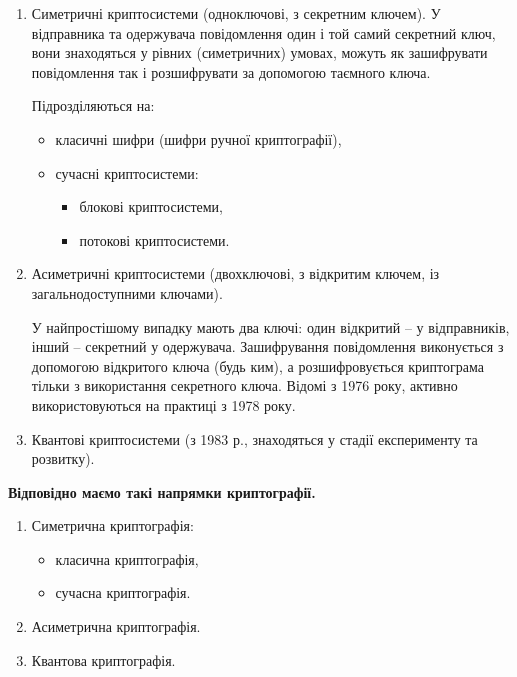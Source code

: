 \begin{enumerate}
    \item Симетричні криптосистеми (одноключові, з секретним ключем).
        У відправника та одержувача повідомлення один і той самий секретний
        ключ, вони знаходяться у рівних (симетричних) умовах, можуть як
        зашифрувати повідомлення так і розшифрувати за допомогою
        таємного ключа.
        
        Підрозділяються на:
        \begin{itemize}
            \item класичні шифри (шифри ручної криптографії),
            \item сучасні криптосистеми:
                \begin{itemize}
                    \item блокові криптосистеми,
                    \item потокові криптосистеми.
                \end{itemize}
        \end{itemize}

        \item Асиметричні криптосистеми (двохключові, з відкритим ключем, із
            загальнодоступними ключами).
            
            У найпростішому випадку мають два ключі: один відкритий – у
            відправників, інший – секретний у одержувача. Зашифрування
            повідомлення виконується з допомогою відкритого ключа (будь ким), а
            розшифровується криптограма тільки з використання секретного
            ключа. Відомі з 1976 року, активно використовуються на практиці з
            1978 року.
        
        \item Квантові криптосистеми (з 1983 р., знаходяться у стадії
            експерименту та розвитку).
\end{enumerate}

\textbf{Відповідно маємо такі напрямки криптографії.}

\begin{enumerate}
    \item Симетрична криптографія:
        \begin{itemize}
            \item класична криптографія,
            \item сучасна криптографія.
        \end{itemize}
    \item Асиметрична криптографія.
    \item Квантова криптографія.
\end{enumerate}

